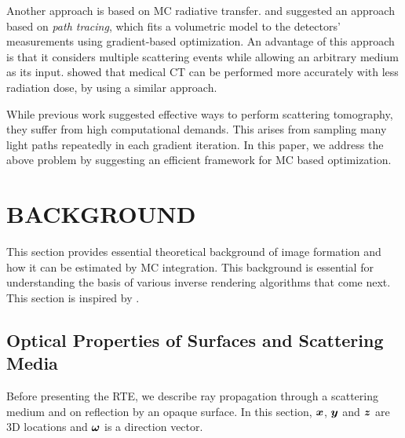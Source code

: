 \documentclass{article}
\begin{document}
Another approach is based on \ac{MC} radiative transfer. \citep{holodovsky2016situ} and \citep{loeub2020monotonicity} suggested an approach based on {\em path tracing}, which fits a volumetric model to the detectors' measurements using gradient-based optimization. An advantage of this approach is that it considers multiple scattering events while allowing an arbitrary medium as its input. \citep{geva2018x} showed that medical \ac{CT} can be performed more accurately with less radiation dose, by using a similar approach. 

While previous work suggested effective ways to perform scattering tomography, they suffer from high computational demands. This arises from sampling many light paths repeatedly in each gradient iteration. In this paper, we address the above problem by suggesting an efficient framework for \ac{MC} based optimization.

\section{BACKGROUND}
\label{sec:forward}
This section provides essential theoretical background of image formation and how it can be estimated by \ac{MC} integration. This background is essential for understanding the basis of various inverse rendering algorithms that come next. This section is inspired by \citep{novak2018monte}.

\subsection{Optical Properties of Surfaces and Scattering Media}
Before presenting the RTE, we describe ray propagation through a scattering medium and on reflection by an opaque surface. In this section, $\boldsymbol{x}$, $\boldsymbol{y}$ and $\boldsymbol{z}$ are 3D locations and $\boldsymbol{\omega}$ is a direction vector.
\end{document}
